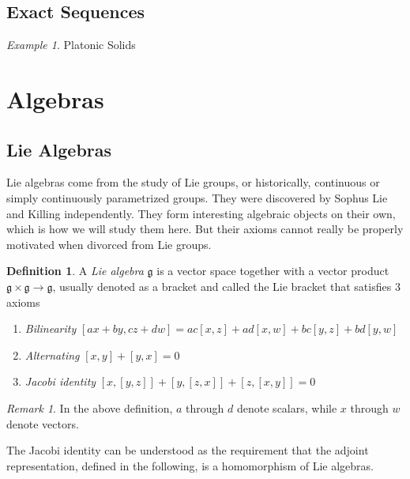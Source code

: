 \documentclass[12pt]{article}
\theoremstyle{definition}
\newtheorem{definition}{Definition}[section]
\theoremstyle{remark}
\newtheorem*{remark}{Remark}
\theoremstyle{example}
\newtheorem{example}{Example}
\begin{document}
\subsection{Exact Sequences}

\begin{example}
	Platonic Solids
\end{example}

\section{Algebras}

\subsection{Lie Algebras}

Lie algebras come from the study of Lie groups, or historically, continuous or simply continuously parametrized groups. They were discovered by Sophus Lie and Killing independently. They form interesting algebraic objects on their own, which is how we will study them here. But their axioms cannot really be properly motivated when divorced from Lie groups.

\begin{definition}
	A \textit{Lie algebra} $\mathfrak{g}$ is a vector space together with a vector product $\mathfrak{g}\times\mathfrak{g}\to\mathfrak{g}$, usually denoted as a bracket and called the Lie bracket that satisfies 3 axioms
	\begin{enumerate}
		\item \textit{Bilinearity}
		\subitem $[ax+by,cz+dw]=ac[x,z]+ad[x,w]+bc[y,z]+bd[y,w]$
		\item \textit{Alternating}
		\subitem $[x,y]+[y,x]=0$
		\item \textit{Jacobi identity}
		\subitem $[x,[y,z]]+[y,[z,x]]+[z,[x,y]]=0$
	\end{enumerate}
\end{definition}

\begin{remark}
	In the above definition, $a$ through $d$ denote scalars, while $x$ through $w$ denote vectors.
	
	The Jacobi identity can be understood as the requirement that the adjoint representation, defined in the following, is a homomorphism of Lie algebras.
\end{remark}
\end{document}
